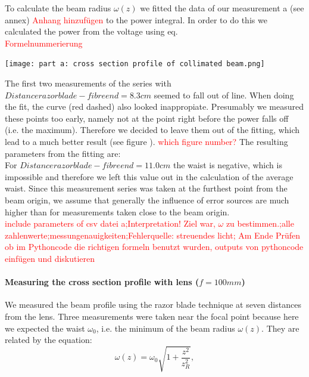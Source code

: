 \documentclass{article}
\begin{document}
To calculate the beam radius $\omega (z)$ we fitted the data of our measurement a (see annex)
\textcolor{red}{Anhang hinzufügen} %
to the power integral. In order to do this we calculated the power from the voltage using eq. \\
\textcolor{red}{Formelnummerierung}

\texttt{[image: part a: cross section profile of collimated beam.png]}

The first two measurements of the series with $Distance razor blade - fibre end = 8.3 cm$ seemed to fall out of line. When doing the fit, the curve (red dashed) also looked inappropiate. Presumably we measured these points too early, namely not at the point right before the power falls off (i.e. the maximum). Therefore we decided to leave them out of the fitting, which lead to a much better result (see figure ).
\textcolor{red}{which figure number?}
The resulting parameters from the fitting are: \\

For $Distance razor blade - fibre end = 11.0 cm$ the waist is negative, which is impossible and therefore we left this value out in the calculation of the average waist. Since this measurement series was taken at the furthest point from the beam origin, we assume that generally the influence of error sources are much higher than for measurements taken close to the beam origin.\\

\textcolor{red}{include parameters of csv datei a;Interpretation! Ziel war, $\omega$ zu bestimmen.;alle zahlenwerte;messungenauigkeiten;Fehlerquelle: streuendes licht; Am Ende Prüfen ob im Pythoncode die richtigen formeln benutzt wurden, outputs von pythoncode einfügen und diskutieren}

\paragraph{Measuring the cross section profile with lens ($f=100mm$)}

We measured the beam profile using the razor blade technique at seven distances from the lens. Three measurements were taken near the focal point because here we expected the waist $\omega_{0}$, i.e. the minimum of the beam radius $\omega (z)$. They are related by the equation:
\begin{equation}
\omega (z) = \omega_{0}\sqrt{1+\frac{z^2}{z_{R}^2}},
\end{equation}
\end{document}
